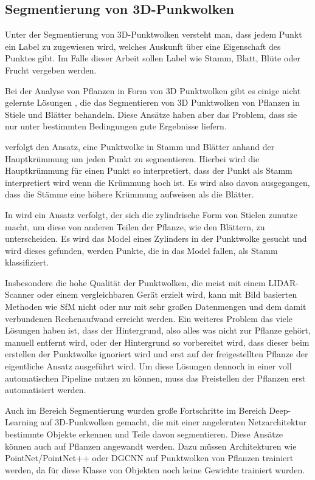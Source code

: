 \documentclass[12pt,titlepage, twoside]{article}
\begin{document}
\subsection{Segmentierung von 3D-Punkwolken}
\label{sec:stand:segmentierung}

Unter der Segmentierung von 3D-Punktwolken versteht man, dass jedem Punkt ein Label zu zugewiesen wird, welches Auskunft über eine Eigenschaft des Punktes gibt.
Im Falle dieser Arbeit sollen Label wie Stamm, Blatt, Blüte oder Frucht vergeben werden.

Bei der Analyse von Pflanzen in Form von 3D Punktwolken gibt es einige nicht gelernte Lösungen \cite{ThreeBasics} \cite{ModelBased}, die das Segmentieren von 3D Punktwolken von Pflanzen in Stiele und Blätter behandeln. 
Diese Ansätze haben aber das Problem, dass sie nur unter bestimmten Bedingungen gute Ergebnisse liefern.

\cite{ThreeBasics} verfolgt den Ansatz, eine Punktwolke in Stamm und Blätter anhand der Hauptkrümmung um jeden Punkt zu segmentieren. 
Hierbei wird die Hauptkrümmung für einen Punkt so interpretiert, dass der Punkt als Stamm interpretiert wird wenn die Krümmung hoch ist. 
Es wird also davon ausgegangen, dass die Stämme eine höhere Krümmung aufweisen als die Blätter. 

In \cite{ModelBased} wird ein Ansatz verfolgt, der sich die zylindrische Form von Stielen zunutze macht, um diese von anderen Teilen der Pflanze, wie den Blättern, zu unterscheiden. 
Es wird das Model eines Zylinders in der Punktwolke gesucht und wird dieses gefunden, werden Punkte, die in das Model fallen, als Stamm klassifiziert.

Insbesondere die hohe Qualität der Punktwolken, die meist mit einem LIDAR-Scanner oder einem vergleichbaren Gerät erzielt wird, 
kann mit Bild basierten Methoden wie SfM nicht oder nur mit sehr großen Datenmengen und dem damit verbundenen Rechenaufwand erreicht werden. 
Ein weiteres Problem das viele Lösungen haben ist, dass der Hintergrund, also alles was nicht zur Pflanze gehört, manuell entfernt wird, 
oder der Hintergrund so vorbereitet wird, dass dieser beim erstellen der Punktwolke ignoriert wird und erst auf der freigestellten Pflanze der eigentliche Ansatz ausgeführt wird. 
Um diese Lösungen dennoch in einer voll automatischen Pipeline nutzen zu können, muss das Freistellen der Pflanzen erst automatisiert werden.

Auch im Bereich Segmentierung wurden große Fortschritte im Bereich Deep-Learning auf 3D-Punkwolken gemacht, die mit einer angelernten Netzarchitektur bestimmte Objekte erkennen und Teile davon segmentieren. 
Diese Ansätze können auch auf Pflanzen angewandt werden. Dazu müssen Architekturen wie PointNet\cite{qi2017pointnet}/PointNet++\cite{qi2017pointnet++} oder DGCNN \cite{dgcnn} auf Punktwolken von Pflanzen trainiert werden, 
da für diese Klasse von Objekten noch keine Gewichte trainiert wurden.
\end{document}
